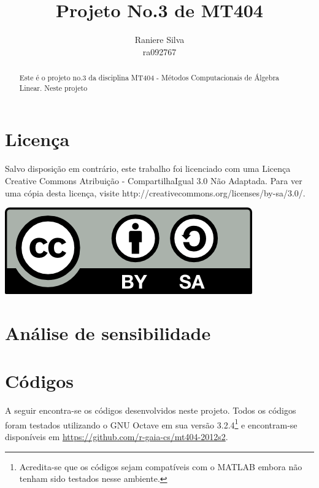 \documentclass[12pt,a4paper]{article}
\begin{document}
\title{Projeto No.3 de MT404}
\author{Raniere Silva \\ ra092767}
\maketitle
\begin{abstract}
    Este \'{e} o projeto no.3 da disciplina MT404 - M\'{e}todos Computacionais de \'{A}lgebra Linear. Neste projeto 
\end{abstract}
\tableofcontents
\lstlistoflistings
\section*{Licen\c{c}a}
Salvo disposi\c{c}\~{a}o em contr\'{a}rio, este trabalho foi licenciado com uma Licen\c{c}a Creative Commons Atribui\c{c}\~{a}o - CompartilhaIgual 3.0 N\~{a}o Adaptada. Para ver uma c\'{o}pia desta licen\c{c}a, visite http://creativecommons.org/licenses/by-sa/3.0/.
\begin{center}
    \includegraphics{../figuras/cc-by-sa.png}
\end{center}
\newpage
\section{An\'{a}lise de sensibilidade}

\section{C\'{o}digos}
A seguir encontra-se os códigos desenvolvidos neste projeto. Todos os códigos foram testados utilizando o GNU Octave em sua versão 3.2.4\footnote{Acredita-se que os códigos sejam compatíveis com o MATLAB embora não tenham sido testados nesse ambiente.} e encontram-se disponíveis em \url{https://github.com/r-gaia-cs/mt404-2012s2}.


\end{document}
